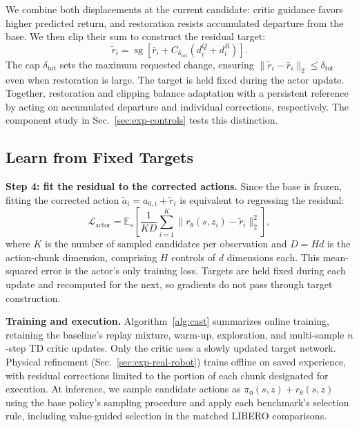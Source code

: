 We combine both displacements at the current candidate: critic guidance favors higher predicted return, and restoration resists accumulated departure from the base. We then clip their sum to construct the residual target:
\begin{equation}
\tilde r_i=\operatorname{sg}\!\left[
\bar r_i+C_{\delta_{\mathrm{tot}}}(d_i^Q+d_i^R)
\right].
\label{eq:field-target}
\end{equation}
The cap $\delta_{\mathrm{tot}}$ sets the maximum requested change, ensuring $\|\tilde r_i-\bar r_i\|_2\leq\delta_{\mathrm{tot}}$ even when restoration is large. The target is held fixed during the actor update. Together, restoration and clipping balance adaptation with a persistent reference by acting on accumulated departure and individual corrections, respectively. The component study in Sec.~\ref{sec:exp-controls} tests this distinction.


\subsection{Learn from Fixed Targets}
\label{sec:field-update}
\textbf{Step 4: fit the residual to the corrected actions.}
Since the base is frozen, fitting the corrected action $\tilde a_i=a_{0,i}+\tilde r_i$ is equivalent to regressing the residual:
\begin{equation}
\mathcal L_{\mathrm{actor}}
=\mathbb{E}_{s}\!\left[
\frac{1}{KD}\sum_{i=1}^{K}
\|r_\theta(s,z_i)-\tilde r_i\|_2^2
\right],
\label{eq:actor-regression}
\end{equation}
where $K$ is the number of sampled candidates per observation and $D=Hd$ is the action-chunk dimension, comprising $H$ controls of $d$ dimensions each. This mean-squared error is the actor's only training loss. Targets are held fixed during each update and recomputed for the next, so gradients do not pass through target construction.

\textbf{Training and execution.}
Algorithm~\ref{alg:cast} summarizes online training, retaining the baseline's replay mixture, warm-up, exploration, and multi-sample $n$-step TD critic updates. Only the critic uses a slowly updated target network. Physical refinement (Sec.~\ref{sec:exp-real-robot}) trains offline on saved experience, with residual corrections limited to the portion of each chunk designated for execution. At inference, we sample candidate actions as $\pi_0(s,z)+r_\theta(s,z)$ using the base policy's sampling procedure and apply each benchmark's selection rule, including value-guided selection in the matched LIBERO comparisons.

